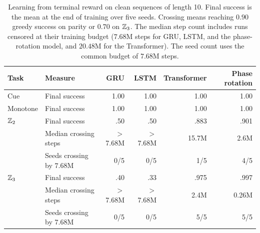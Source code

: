 \begin{table}[!hbp]
\centering\small
\caption{Learning from terminal reward on clean sequences of length 10.
Final success is the mean at the end of training over five seeds.
Crossing means reaching $0.90$ greedy success on parity or $0.70$ on $\mathbb{Z}_3$.
The median step count includes runs censored at their training budget
($7.68$M steps for GRU, LSTM, and the phase-rotation model, and $20.48$M for the Transformer).
The seed count uses the common budget of $7.68$M steps.}
\label{tab:main}
\begin{tabular}{llrrrr}
\toprule
Task & Measure & GRU & LSTM & Transformer & Phase rotation \\
\midrule
Cue & Final success & 1.00 & 1.00 & 1.00 & 1.00 \\
Monotone & Final success & 1.00 & 1.00 & 1.00 & 1.00 \\
\midrule
$\mathbb{Z}_2$ & Final success & .50 & .50 & .883 & .901 \\
      & Median crossing steps & $>$7.68M & $>$7.68M & 15.7M & 2.6M \\
      & Seeds crossing by $7.68$M & 0/5 & 0/5 & 1/5 & 4/5 \\
$\mathbb{Z}_3$ & Final success & .40 & .33 & .975 & .997 \\
      & Median crossing steps & $>$7.68M & $>$7.68M & 2.4M & 0.26M \\
      & Seeds crossing by $7.68$M & 0/5 & 0/5 & 5/5 & 5/5 \\
\bottomrule
\end{tabular}
\end{table}
